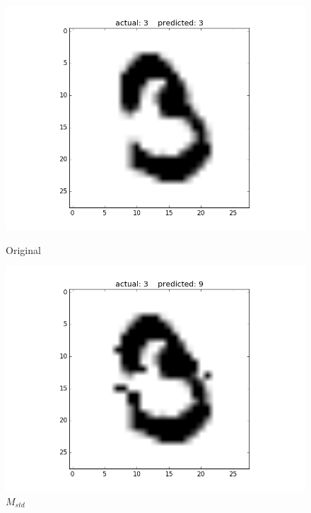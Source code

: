 \documentclass{article}
\begin{document}
\begin{figure}[h!]
	\begin{minipage}{0.3\textwidth}
		\centering
		\includegraphics[width=\textwidth]{original1.png}
		\caption{Original}
	\end{minipage} \hfill
	\begin{minipage}{0.3\textwidth}
		\centering
		\includegraphics[width=\textwidth]{std1.png}
		\caption{$M_{std}$}
	\end{minipage} 
	\begin{minipage}{0.3\textwidth}
		\centering

\end{minipage}
\end{figure}
\end{document}
